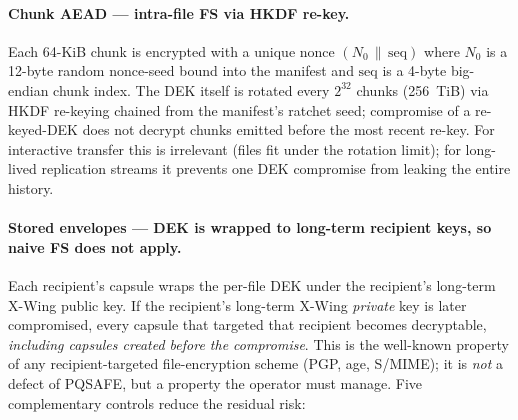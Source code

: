 \documentclass[11pt,a4paper]{article}
\begin{document}
\paragraph{Chunk AEAD --- intra-file FS via HKDF re-key.}
Each 64-KiB chunk is encrypted with a unique nonce
$(N_0\,\|\,\text{seq})$ where $N_0$ is a 12-byte random nonce-seed
bound into the manifest and $\text{seq}$ is a 4-byte big-endian chunk
index. The DEK itself is rotated every $2^{32}$ chunks (256~TiB) via
HKDF re-keying chained from the manifest's ratchet seed; compromise of
a re-keyed-DEK does not decrypt chunks emitted before the most recent
re-key. For interactive transfer this is irrelevant (files fit under
the rotation limit); for long-lived replication streams it prevents
one DEK compromise from leaking the entire history.

\paragraph{Stored envelopes --- DEK is wrapped to long-term recipient
keys, so naive FS does not apply.}
Each recipient's capsule wraps the per-file DEK under the recipient's
long-term X-Wing public key. If the recipient's long-term X-Wing
\emph{private} key is later compromised, every capsule that targeted
that recipient becomes decryptable, \emph{including capsules created
before the compromise}. This is the well-known property of any
recipient-targeted file-encryption scheme (PGP, age, S/MIME); it is
\emph{not} a defect of PQSAFE, but a property the operator must
manage. Five complementary controls reduce the residual risk:
\end{document}
